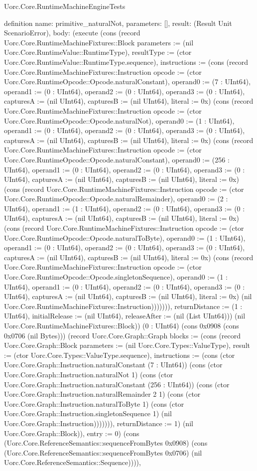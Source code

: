 \begin{lexlean}{Uorc.Core.RuntimeMachineEngineTests}
\begin{semanticmodule}
definition{
  name: primitive_naturalNot,
  parameters: [],
  result: (Result Unit ScenarioError),
  body: (execute (cons (record Uorc.Core.RuntimeMachineFixtures::Block {parameters := (nil Uorc.Core.RuntimeValue::RuntimeType), resultType := (ctor Uorc.Core.RuntimeValue::RuntimeType.sequence), instructions := (cons (record Uorc.Core.RuntimeMachineFixtures::Instruction {opcode := (ctor Uorc.Core.RuntimeOpcode::Opcode.naturalConstant), operand0 := (7 : UInt64), operand1 := (0 : UInt64), operand2 := (0 : UInt64), operand3 := (0 : UInt64), capturesA := (nil UInt64), capturesB := (nil UInt64), literal := 0x}) (cons (record Uorc.Core.RuntimeMachineFixtures::Instruction {opcode := (ctor Uorc.Core.RuntimeOpcode::Opcode.naturalNot), operand0 := (1 : UInt64), operand1 := (0 : UInt64), operand2 := (0 : UInt64), operand3 := (0 : UInt64), capturesA := (nil UInt64), capturesB := (nil UInt64), literal := 0x}) (cons (record Uorc.Core.RuntimeMachineFixtures::Instruction {opcode := (ctor Uorc.Core.RuntimeOpcode::Opcode.naturalConstant), operand0 := (256 : UInt64), operand1 := (0 : UInt64), operand2 := (0 : UInt64), operand3 := (0 : UInt64), capturesA := (nil UInt64), capturesB := (nil UInt64), literal := 0x}) (cons (record Uorc.Core.RuntimeMachineFixtures::Instruction {opcode := (ctor Uorc.Core.RuntimeOpcode::Opcode.naturalRemainder), operand0 := (2 : UInt64), operand1 := (1 : UInt64), operand2 := (0 : UInt64), operand3 := (0 : UInt64), capturesA := (nil UInt64), capturesB := (nil UInt64), literal := 0x}) (cons (record Uorc.Core.RuntimeMachineFixtures::Instruction {opcode := (ctor Uorc.Core.RuntimeOpcode::Opcode.naturalToByte), operand0 := (1 : UInt64), operand1 := (0 : UInt64), operand2 := (0 : UInt64), operand3 := (0 : UInt64), capturesA := (nil UInt64), capturesB := (nil UInt64), literal := 0x}) (cons (record Uorc.Core.RuntimeMachineFixtures::Instruction {opcode := (ctor Uorc.Core.RuntimeOpcode::Opcode.singletonSequence), operand0 := (1 : UInt64), operand1 := (0 : UInt64), operand2 := (0 : UInt64), operand3 := (0 : UInt64), capturesA := (nil UInt64), capturesB := (nil UInt64), literal := 0x}) (nil Uorc.Core.RuntimeMachineFixtures::Instruction))))))), returnDistance := (1 : UInt64), initialRelease := (nil UInt64), releaseAfter := (nil (List UInt64))}) (nil Uorc.Core.RuntimeMachineFixtures::Block)) (0 : UInt64) (cons 0x0908 (cons 0x0706 (nil Bytes))) (record Uorc.Core.Graph::Graph {blocks := (cons (record Uorc.Core.Graph::Block {parameters := (nil Uorc.Core.Types::ValueType), result := (ctor Uorc.Core.Types::ValueType.sequence), instructions := (cons (ctor Uorc.Core.Graph::Instruction.naturalConstant (7 : UInt64)) (cons (ctor Uorc.Core.Graph::Instruction.naturalNot 1) (cons (ctor Uorc.Core.Graph::Instruction.naturalConstant (256 : UInt64)) (cons (ctor Uorc.Core.Graph::Instruction.naturalRemainder 2 1) (cons (ctor Uorc.Core.Graph::Instruction.naturalToByte 1) (cons (ctor Uorc.Core.Graph::Instruction.singletonSequence 1) (nil Uorc.Core.Graph::Instruction))))))), returnDistance := 1}) (nil Uorc.Core.Graph::Block)), entry := 0}) (cons (Uorc.Core.ReferenceSemantics::sequenceFromBytes 0x0908) (cons (Uorc.Core.ReferenceSemantics::sequenceFromBytes 0x0706) (nil Uorc.Core.ReferenceSemantics::Sequence)))),
}
\end{semanticmodule}
\end{lexlean}
